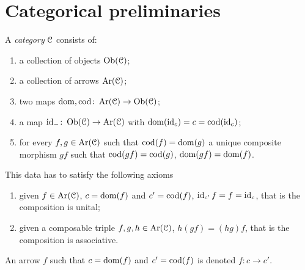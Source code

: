 \documentclass[a4paper,11pt,oneside,openany]{scrbook}
\begin{document}
\mainmatter



\chapter*{Categorical preliminaries}
\begin{defn}[Categories]
	A \emph{category} $\C$ consists of:
	\begin{enumerate}
		\item a collection of objects $\Ob(\C)$;
		\item a collection of arrows $\Ar(\C)$;
		\item two maps $\dom,\cod\colon\Ar(\C)\rightarrow\Ob(\C)$;
		\item a map $\id_{-}\colon\Ob(\C)\rightarrow\Ar(\C)$ with $\dom(\id_{c})=c=\cod(\id_{c})$;
		\item for every $f,g\in\Ar(\C)$ such that $\cod(f)=\dom(g)$ a unique composite morphism $gf$ such that $\cod(gf)=\cod(g)$, $\dom(gf)=\dom(f)$.
	\end{enumerate}
	This data has to satisfy the following axioms
	\begin{enumerate}
		\item given $f\in\Ar(\C)$, $c=\dom(f)$ and $c'=\cod(f)$, $\id_{c'}f=f=\id_{c}$, that is the composition is unital;
		\item given a composable triple $f,g,h\in\Ar(\C)$, $h(gf)=(hg)f$, that is the composition is associative.
	\end{enumerate}
	An arrow $f$ such that $c=\dom(f)$ and $c'=\cod(f)$ is denoted $f\colon c\rightarrow c'$.
\end{defn}

\begin{defn}[Functors]

\end{defn}

\begin{defn}

\end{defn}

\begin{defn}

\end{defn}

\begin{defn}
\end{defn}

\begin{defn}

\end{defn}
\end{document}
